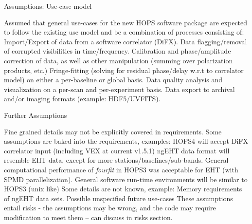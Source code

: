 \documentclass[8pt]{beamer}
\newcommand{\FIX}[1][fixme]{{\color{red}#1}}
\begin{document}
\begin{frame}{Assumptions: Use-case model}

\begin{outline}
  \1 Assumed that general use-cases for the new HOPS software package are expected to follow the existing use model and be a combination of processes consisting of:
  \2 Import/Export of data from a software correlator (DiFX).
  \2 Data flagging/removal of corrupted visibilities in time/frequency.
  \2 Calibration and phase/amplitude correction of data, as well as other manipulation (summing over polarization products, etc.)
  \2 Fringe-fitting (solving for residual phase/delay w.r.t to correlator model) on either a per-baseline or global basis.
  \2 Data quality analysis and visualization on a per-scan and per-experiment basis.
  \2 Data export to archival and/or imaging formats (example: HDF5/UVFITS).
\end{outline}
    
\end{frame}

\begin{frame}{Further Assumptions}


\begin{outline}
    \1 Fine grained details may not be explicitly covered in requirements. Some assumptions are baked into the requirements, examples:
        \2 HOPS4 will accept DiFX correlator input (including VEX at current v1.5.1) 
        \2 ngEHT data format will resemble EHT data, except for more stations/baselines/sub-bands.
        \2 General computational performance of \textit{fourfit} in HOPS3 was acceptable for EHT (with SPMD parallelization).
        \2 General software run-time environments will be similar to HOPS3 (unix like)
    \1 Some details are not known, example:
        \2 Memory requirements of ngEHT data sets.
        \2 Possible unspecified future use-cases
    \1 These assumptions entail risks - the assumptions may be wrong, and the code may require modification to meet them -- can discuss in risks section.
\end{outline}

\end{frame}
\end{document}
